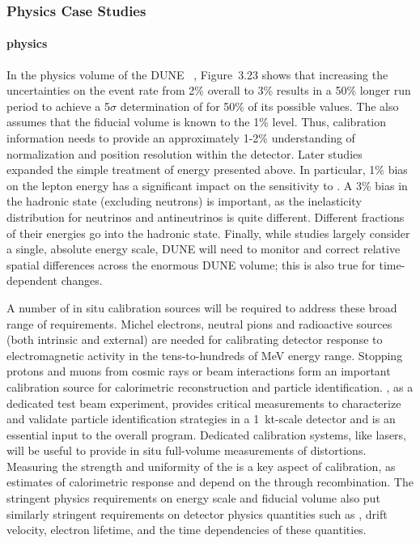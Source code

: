 \subsubsection{Physics Case Studies}

\paragraph{ physics}
\label{sec:phys-calib-lbl}
In the physics volume of the DUNE ~\cite{Acciarri:2015uup}, Figure~3.23 shows that increasing the uncertainties on the \nue event rate from \num{2}\% overall to \num{3}\% results in a \num{50}\% longer run period to achieve a 5$\sigma$ determination of  for 50\% of its possible values. 
The  also assumes that the fiducial volume is known to the 1\% level. Thus, calibration information needs to provide an approximately 1-2\% understanding of normalization 
and position resolution within the detector. Later studies~\cite{ebias} expanded the simple treatment of energy  presented above. In particular, \num{1}\% bias on the lepton energy has a significant impact on the sensitivity to . 
%
A \num{3}\% bias in the hadronic state (excluding neutrons) is important, as the inelasticity  distribution for neutrinos and antineutrinos is quite different.  Different fractions of their energies go into the hadronic state. Finally, while studies largely consider a single, absolute energy scale, DUNE will need to monitor and correct relative spatial differences across the enormous DUNE  volume; this is also true for time-dependent changes. 

A number of in situ calibration sources will be required to address these broad range of requirements. 
Michel electrons, neutral pions and radioactive sources (both intrinsic and external) are needed for calibrating detector response to electromagnetic activity in the tens-to-hundreds of MeV energy range. Stopping protons and muons from cosmic rays or beam interactions form an important calibration source for calorimetric reconstruction and particle identification. 
, as a dedicated test beam experiment, provides critical measurements to characterize and validate particle identification strategies in a \SI{1}{kt}-scale detector and is an essential input to the overall program. Dedicated calibration systems, like lasers, will be useful to provide in situ full-volume measurements of \efield distortions. 
Measuring the strength and uniformity of the \efield is a key aspect of calibration, as  estimates of calorimetric response and  depend on the \efield through recombination. The stringent physics requirements on energy scale and fiducial volume also put similarly stringent requirements on detector physics quantities such as \efield, drift velocity, electron lifetime, and the time dependencies of these quantities. 

